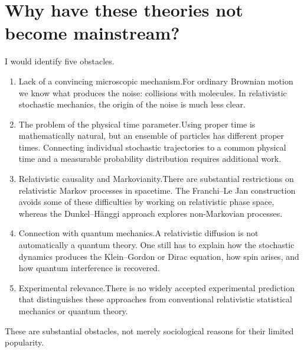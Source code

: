 \section{ Why have these theories not become mainstream?}
I would identify five obstacles.
\begin{enumerate}
   \item Lack of a convincing microscopic mechanism.For ordinary Brownian motion we know what produces the noise: collisions with molecules. In relativistic stochastic mechanics, the origin of the noise is much less clear.
   \item The problem of the physical time parameter.Using proper time is mathematically natural, but an ensemble of particles has different proper times. Connecting individual stochastic trajectories to a common physical time and a measurable probability distribution requires additional work.
   \item Relativistic causality and Markovianity.There are substantial restrictions on relativistic Markov processes in spacetime. The Franchi–Le Jan construction avoids some of these difficulties by working on relativistic phase space, whereas the Dunkel–Hänggi approach explores non-Markovian processes.
   \item Connection with quantum mechanics.A relativistic diffusion is not automatically a quantum theory. One still has to explain how the stochastic dynamics produces the Klein–Gordon or Dirac equation, how spin arises, and how quantum interference is recovered.
   \item Experimental relevance.There is no widely accepted experimental prediction that distinguishes these approaches from conventional relativistic statistical mechanics or quantum theory.
\end{enumerate}
These are substantial obstacles, not merely sociological reasons for their limited popularity.

